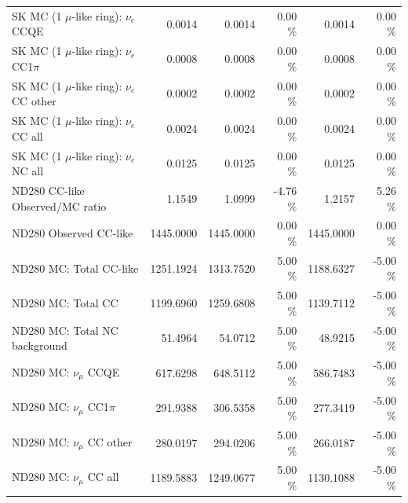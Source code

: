 \begin{table}
\begin{tabular}{| l | r | r  r | r  r |}
                             SK MC (1 $\mu$-like ring): $\nu_{e}$ CCQE &          0.0014 &          0.0014 &  0.00 \%  &          0.0014 &  0.00 \%  \\ 
                         SK MC (1 $\mu$-like ring): $\nu_{e}$ CC1$\pi$ &          0.0008 &          0.0008 &  0.00 \%  &          0.0008 &  0.00 \%  \\ 
                         SK MC (1 $\mu$-like ring): $\nu_{e}$ CC other &          0.0002 &          0.0002 &  0.00 \%  &          0.0002 &  0.00 \%  \\ 
                           SK MC (1 $\mu$-like ring): $\nu_{e}$ CC all &          0.0024 &          0.0024 &  0.00 \%  &          0.0024 &  0.00 \%  \\ 
                           SK MC (1 $\mu$-like ring): $\nu_{e}$ NC all &          0.0125 &          0.0125 &  0.00 \%  &          0.0125 &  0.00 \%  \\ 
\hline
                                       ND280 CC-like Observed/MC ratio &          1.1549 &          1.0999 & -4.76 \%  &          1.2157 &  5.26 \%  \\ 
                                                ND280 Observed CC-like &       1445.0000 &       1445.0000 &  0.00 \%  &       1445.0000 &  0.00 \%  \\ 
                                               ND280 MC: Total CC-like &       1251.1924 &       1313.7520 &  5.00 \%  &       1188.6327 & -5.00 \%  \\ 
                                                    ND280 MC: Total CC &       1199.6960 &       1259.6808 &  5.00 \%  &       1139.7112 & -5.00 \%  \\ 
                                         ND280 MC: Total NC background &         51.4964 &         54.0712 &  5.00 \%  &         48.9215 & -5.00 \%  \\ 
\hline
                                            ND280 MC: $\nu_{\mu}$ CCQE &        617.6298 &        648.5112 &  5.00 \%  &        586.7483 & -5.00 \%  \\ 
                                        ND280 MC: $\nu_{\mu}$ CC1$\pi$ &        291.9388 &        306.5358 &  5.00 \%  &        277.3419 & -5.00 \%  \\ 
                                        ND280 MC: $\nu_{\mu}$ CC other &        280.0197 &        294.0206 &  5.00 \%  &        266.0187 & -5.00 \%  \\ 
                                          ND280 MC: $\nu_{\mu}$ CC all &       1189.5883 &       1249.0677 &  5.00 \%  &       1130.1088 & -5.00 \%  \\ 

\end{tabular}
\end{table}
